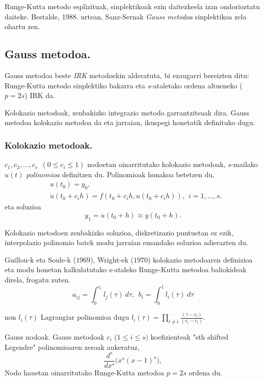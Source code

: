 Runge-Kutta metodo esplizituak, sinplektikoak ezin daitezkeela izan ondorioztatu daiteke. Bestalde, 1988. urtean, Sanz-Sernak \emph{Gauss metodoa} sinplektikoa zela ohartu zen. 

\subsection{Gauss metodoa.}

Gauss metodoa beste \emph{IRK} metodoekin alderatuta, bi ezaugarri bereizten ditu:  Runge-Kutta metodo sinplektiko bakarra eta $s$-ataletako ordena altueneko ($p=2s$) IRK da. 

Kolokazio metodoak, zenbakizko integrazio metodo garrantzitsuak dira. Gauss metodoa kolokazio metodoa da eta jarraian, ikuspegi honetatik definituko dugu. 

\subsubsection*{Kolokazio metodoak.}

$c_1,c_2,\dots,c_s \ \ (0\leq c_i \leq 1)$ nodoetan oinarritutako kolokazio metodoak, $s$-mailako $u(t)$  \emph{polinomioa} definitzen du. Polinomioak honakoa betetzen du,
\begin{align*}
&u(t_0) =y_0, \\
&\dot{u}(t_0+c_ih) =f(t_0+c_i h, u(t_0+c_i h)), \ \ i=1,\dots,s.
\end{align*}
eta soluzioa 
\begin{equation*}
y_1=u(t_0+h)\approx y(t_0+h).
\end{equation*} 

Kolokazio metodoen zenbakizko soluzioa, diskretizazio puntuetan ez ezik, interpolazio polinomio batek modu jarraian emandako soluzioa adierazten du. 

Guillou-k eta Soule-k ($1969$), Wright-ek ($1970$) \cite{Hairer2006} kolokazio metodoaren definizioa eta modu honetan kalkulatutako s-ataleko Runge-Kutta metodoa baliokideak direla, frogatu zuten.
\begin{equation}
a_{ij}=\int_{0}^{c_i} l_j(\tau) \ d\tau, \ \ b_i=\int_{0}^{1} l_i(\tau) \ d\tau
\end{equation}

non $l_i(\tau)$ Lagrangiar polinomioa dugu $l_i(\tau)=\prod_{l\neq i} \frac{(\tau-c_l)}{(c_i-c_l)}$.

Gauss nodoak. Gauss metodoak $c_i$ ($1 \leq i \leq s)$ koefizienteak "sth shifted Legendre" polinomioaren zeroak aukeratuz,
\begin{equation*}
\frac{d^s}{dx^s} \big(x^s(x-1)^s \big),
\end{equation*} 
Nodo hauetan oinarritutako Runge-Kutta metodoa $p=2s$ ordena du.

